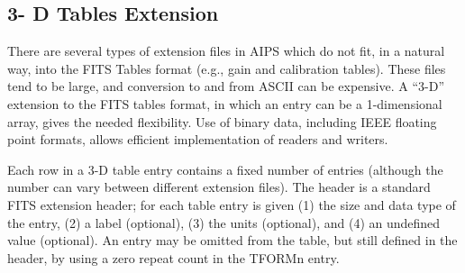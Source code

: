 \subsection{3- D Tables Extension }
There are several types of extension files in AIPS which do not fit, in
a natural way, into the FITS Tables format (e.g., gain and calibration
tables).  These files tend to be large, and conversion to and from
ASCII can be expensive.  A ``3-D'' extension to the FITS tables format,
in which an entry can be a 1-dimensional array, gives the needed
flexibility.  Use of binary data, including IEEE floating point
formats, allows efficient implementation of readers and writers.

Each row in a 3-D table entry contains a fixed number of entries
(although the number can vary between different extension files).  The
header is a standard FITS extension header; for each table entry is
given (1) the size and data type of the entry, (2) a label (optional),
(3) the units (optional), and (4) an undefined value (optional).  An
entry may be omitted from the table, but still defined in the header,
by using a zero repeat count in the TFORMn entry.

